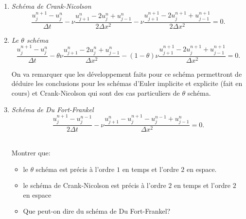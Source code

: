 \documentclass[12pt,a4paper]{article}
\begin{document}
\begin{enumerate}
%

\item {\it Sch\'ema de Crank-Nicolson}
$$
\frac{u_j^{n+1}-u_j^n}{\Delta t}-\nu \frac{u_{j+1}^{n}-2u_j^n+u_{j-1}^{n}}{2\Delta x^2}-\nu \frac{u_{j+1}^{n+1}-2u_j^{n+1}+u_{j-1}^{n+1}}{2\Delta x^2}=0.
$$

\item {\it Le $\theta$ sch\'ema}
$$
\frac{u_j^{n+1}-u_j^n}{\Delta t}-\theta\nu \frac{u_{j+1}^{n}-2u_j^n+u_{j-1}^{n}}{\Delta x^2}-(1-\theta)\nu \frac{u_{j+1}^{n+1}-2u_j^{n+1}+u_{j-1}^{n+1}}{\Delta x^2}=0.
$$

On va remarquer que les d\'eveloppement faits pour ce sch\'ema permettront de d\'eduire les conclusions pour les sch\'emas d'Euler implicite et explicite (fait en cours) et Crank-Nicolson qui sont des cas particuliers de $\theta$ sch\'ema.

\item {\it Sch\'ema de Du Fort-Frankel}
$$
\frac{u_j^{n+1}-u_j^{n-1}}{2\Delta t}-\nu \frac{u_{j+1}^{n}-u_j^{n+1}-u_j^{n-1}+u_{j-1}^{n}}{\Delta x^2}=0.
$$

\newpage
{}\\
Montrer que:
\begin{itemize}
\item  le $\theta$ sch\'ema est pr\'ecis \`a l'ordre
$1$ en temps et l'ordre $2$ en espace.
\item le sch\'ema de Crank-Nicolson
est pr\'ecis \`a l'ordre $2$ en temps et l'ordre $2$
en espace
\item Que peut-on dire du sch\'ema de
Du Fort-Frankel?
\end{itemize}


\end{enumerate}
\end{document}
